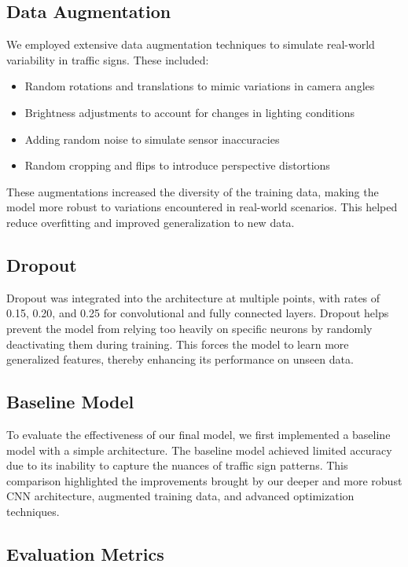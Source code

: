 \documentclass{article} %
\begin{document}
\subsection{Data Augmentation}

We employed extensive data augmentation techniques to simulate real-world variability in traffic signs. These included:
\begin{itemize}
    \item Random rotations and translations to mimic variations in camera angles
    \item Brightness adjustments to account for changes in lighting conditions
    \item Adding random noise to simulate sensor inaccuracies
    \item Random cropping and flips to introduce perspective distortions
\end{itemize}

These augmentations increased the diversity of the training data, making the model more robust to variations encountered in real-world scenarios. This helped reduce overfitting and improved generalization to new data.

\subsection{Dropout}

Dropout was integrated into the architecture at multiple points, with rates of 0.15, 0.20, and 0.25 for convolutional and fully connected layers. Dropout helps prevent the model from relying too heavily on specific neurons by randomly deactivating them during training. This forces the model to learn more generalized features, thereby enhancing its performance on unseen data.

\subsection{Baseline Model}

To evaluate the effectiveness of our final model, we first implemented a baseline model with a simple architecture. The baseline model achieved limited accuracy due to its inability to capture the nuances of traffic sign patterns. This comparison highlighted the improvements brought by our deeper and more robust CNN architecture, augmented training data, and advanced optimization techniques.

\subsection{Evaluation Metrics}
\end{document}
